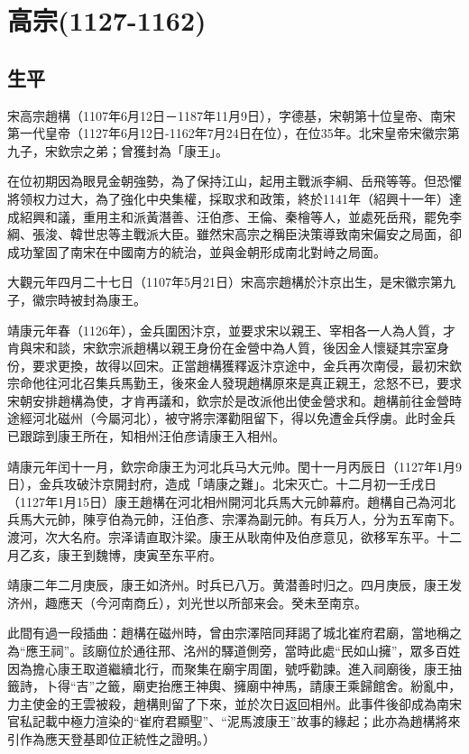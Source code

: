 
\section{高宗\tiny(1127-1162)}

\subsection{生平}

宋高宗趙構（1107年6月12日－1187年11月9日），字德基，宋朝第十位皇帝、南宋第一代皇帝（1127年6月12日-1162年7月24日在位），在位35年。北宋皇帝宋徽宗第九子，宋欽宗之弟；曾獲封為「康王」。

在位初期因為眼見金朝強勢，為了保持江山，起用主戰派李綱、岳飛等等。但恐懼將领权力过大，為了強化中央集權，採取求和政策，終於1141年（紹興十一年）達成紹興和議，重用主和派黃潛善、汪伯彥、王倫、秦檜等人，並處死岳飛，罷免李綱、張浚、韓世忠等主戰派大臣。雖然宋高宗之稱臣決策導致南宋偏安之局面，卻成功鞏固了南宋在中國南方的統治，並與金朝形成南北對峙之局面。

大觀元年四月二十七日（1107年5月21日）宋高宗趙構於汴京出生，是宋徽宗第九子，徽宗時被封為康王。

靖康元年春（1126年），金兵圍困汴京，並要求宋以親王、宰相各一人為人質，才肯與宋和談，宋欽宗派趙構以親王身份在金營中為人質，後因金人懷疑其宗室身份，要求更換，故得以回宋。正當趙構獲釋返汴京途中，金兵再次南侵，最初宋欽宗命他往河北召集兵馬勤王，後來金人發現趙構原來是真正親王，忿怒不已，要求宋朝安排趙構為使，才肯再議和，欽宗於是改派他出使金營求和。趙構前往金營時途經河北磁州（今屬河北），被守將宗澤勸阻留下，得以免遭金兵俘虜。此时金兵已跟踪到康王所在，知相州汪伯彦请康王入相州。

靖康元年闰十一月，欽宗命康王为河北兵马大元帅。閏十一月丙辰日（1127年1月9日），金兵攻破汴京開封府，造成「靖康之難」。北宋灭亡。十二月初一壬戌日（1127年1月15日）康王趙構在河北相州開河北兵馬大元帥幕府。趙構自己為河北兵馬大元帥，陳亨伯為元帥，汪伯彥、宗澤為副元帥。有兵万人，分为五军南下。渡河，次大名府。宗泽请直取汴梁。康王从耿南仲及伯彦意见，欲移军东平。十二月乙亥，康王到魏博，庚寅至东平府。

靖康二年二月庚辰，康王如济州。时兵已八万。黄潜善时归之。四月庚辰，康王发济州，趣應天（今河南商丘），刘光世以所部来会。癸未至南京。

此間有過一段插曲：趙構在磁州時，曾由宗澤陪同拜謁了城北崔府君廟，當地稱之為“應王祠”。該廟位於通往邢、洺州的驛道側旁，當時此處“民如山擁”，眾多百姓因為擔心康王取道繼續北行，而聚集在廟宇周圍，號呼勸諫。進入祠廟後，康王抽籤詩，卜得“吉”之籤，廟吏抬應王神輿、擁廟中神馬，請康王乘歸館舍。紛亂中，力主使金的王雲被殺，趙構則留了下來，並於次日返回相州。此事件後卻成為南宋官私記載中極力渲染的“崔府君顯聖”、“泥馬渡康王”故事的緣起；此亦為趙構將來引作為應天登基即位正統性之證明。）

